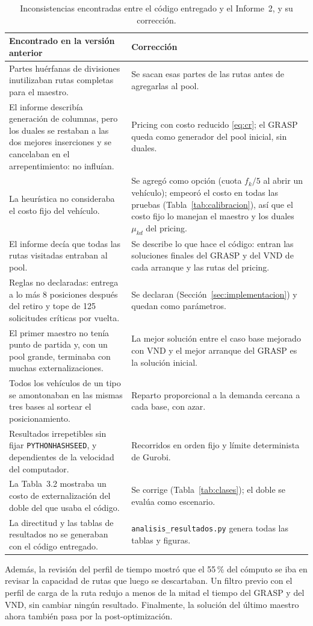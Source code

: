 \begin{table}[htbp]
\centering
\caption{Inconsistencias encontradas entre el código entregado y el Informe~2, y su corrección.}\label{tab:auditoria}
\footnotesize
\begin{tabularx}{\textwidth}{YY}
\toprule
Encontrado en la versión anterior & Corrección \\
\midrule
Partes huérfanas de divisiones inutilizaban rutas completas para el maestro. & Se sacan esas partes de las rutas antes de agregarlas al pool. \\
El informe describía generación de columnas, pero los duales se restaban a las dos mejores inserciones y se cancelaban en el arrepentimiento: no influían. & Pricing con costo reducido \eqref{eq:cr}; el GRASP queda como generador del pool inicial, sin duales. \\
La heurística no consideraba el costo fijo del vehículo. & Se agregó como opción (cuota $f_k/5$ al abrir un vehículo); empeoró el costo en todas las pruebas (Tabla~\ref{tab:calibracion}), así que el costo fijo lo manejan el maestro y los duales $\mu_{kd}$ del pricing. \\
El informe decía que todas las rutas visitadas entraban al pool. & Se describe lo que hace el código: entran las soluciones finales del GRASP y del VND de cada arranque y las rutas del pricing. \\
Reglas no declaradas: entrega a lo más 8 posiciones después del retiro y tope de 125 solicitudes críticas por vuelta. & Se declaran (Sección~\ref{sec:implementacion}) y quedan como parámetros. \\
El primer maestro no tenía punto de partida y, con un pool grande, terminaba con muchas externalizaciones. & La mejor solución entre el caso base mejorado con VND y el mejor arranque del GRASP es la solución inicial. \\
Todos los vehículos de un tipo se amontonaban en las mismas tres bases al sortear el posicionamiento. & Reparto proporcional a la demanda cercana a cada base, con azar. \\
Resultados irrepetibles sin fijar \texttt{PYTHONHASHSEED}, y dependientes de la velocidad del computador. & Recorridos en orden fijo y límite determinista de Gurobi. \\
La Tabla~3.2 mostraba un costo de externalización del doble del que usaba el código. & Se corrige (Tabla~\ref{tab:clases}); el doble se evalúa como escenario. \\
La directitud y las tablas de resultados no se generaban con el código entregado. & \texttt{analisis\_resultados.py} genera todas las tablas y figuras. \\
\bottomrule
\end{tabularx}
\end{table}

Además, la revisión del perfil de tiempo mostró que el 55\,\% del cómputo se iba en revisar la capacidad de rutas que luego se descartaban. Un filtro previo con el perfil de carga de la ruta redujo a menos de la mitad el tiempo del GRASP y del VND, sin cambiar ningún resultado. Finalmente, la solución del último maestro ahora también pasa por la post-optimización.
